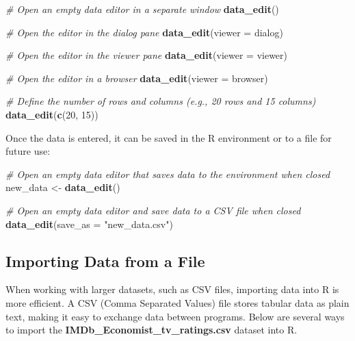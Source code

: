 \documentclass[
]{book}
\newenvironment{Shaded}{\begin{snugshade}}{\end{snugshade}}
\newcommand{\AttributeTok}[1]{\textcolor[rgb]{0.13,0.29,0.53}{#1}}
\newcommand{\CommentTok}[1]{\textcolor[rgb]{0.56,0.35,0.01}{\textit{#1}}}
\newcommand{\DecValTok}[1]{\textcolor[rgb]{0.00,0.00,0.81}{#1}}
\newcommand{\FunctionTok}[1]{\textcolor[rgb]{0.13,0.29,0.53}{\textbf{#1}}}
\newcommand{\NormalTok}[1]{#1}
\newcommand{\OtherTok}[1]{\textcolor[rgb]{0.56,0.35,0.01}{#1}}
\newcommand{\StringTok}[1]{\textcolor[rgb]{0.31,0.60,0.02}{#1}}
\begin{document}
\begin{Shaded}
\begin{Highlighting}[]
\CommentTok{\# Open an empty data editor in a separate window}
\FunctionTok{data\_edit}\NormalTok{()}

\CommentTok{\# Open the editor in the dialog pane}
\FunctionTok{data\_edit}\NormalTok{(}\AttributeTok{viewer =} \StringTok{\textquotesingle{}dialog\textquotesingle{}}\NormalTok{)}

\CommentTok{\# Open the editor in the viewer pane}
\FunctionTok{data\_edit}\NormalTok{(}\AttributeTok{viewer =} \StringTok{\textquotesingle{}viewer\textquotesingle{}}\NormalTok{)}

\CommentTok{\# Open the editor in a browser}
\FunctionTok{data\_edit}\NormalTok{(}\AttributeTok{viewer =} \StringTok{\textquotesingle{}browser\textquotesingle{}}\NormalTok{)}

\CommentTok{\# Define the number of rows and columns (e.g., 20 rows and 15 columns)}
\FunctionTok{data\_edit}\NormalTok{(}\FunctionTok{c}\NormalTok{(}\DecValTok{20}\NormalTok{, }\DecValTok{15}\NormalTok{))}
\end{Highlighting}
\end{Shaded}

Once the data is entered, it can be saved in the R environment or to a file for future use:

\begin{Shaded}
\begin{Highlighting}[]
\CommentTok{\# Open an empty data editor that saves data to the environment when closed}
\NormalTok{new\_data }\OtherTok{\textless{}{-}} \FunctionTok{data\_edit}\NormalTok{()}

\CommentTok{\# Open an empty data editor and save data to a CSV file when closed}
\FunctionTok{data\_edit}\NormalTok{(}\AttributeTok{save\_as =} \StringTok{"new\_data.csv"}\NormalTok{)}
\end{Highlighting}
\end{Shaded}

\subsection*{Importing Data from a File}\label{importing-data-from-a-file}

When working with larger datasets, such as CSV files, importing data into R is more efficient. A CSV (Comma Separated Values) file stores tabular data as plain text, making it easy to exchange data between programs. Below are several ways to import the \textbf{IMDb\_Economist\_tv\_ratings.csv} dataset into R.
\end{document}
